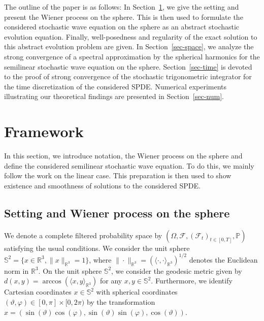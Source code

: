 \documentclass[a4paper]{amsart}
\theoremstyle{remark}
\theoremstyle{definition}
\newcommand{\R}{{\mathbb R}}
\newcommand{\IS}{\mathbb{S}}
\begin{document}
The outline of the paper is as follows: In Section~\ref{sect-fram}, we give the setting and present the Wiener process on the sphere. This is then used to formulate the considered stochastic wave equation on the sphere as an abstract stochastic evolution equation. Finally, well-posedness and regularity of the exact solution to this abstract evolution problem are given. In Section~\ref{sec-space}, we analyze the strong convergence of a spectral approximation by the spherical harmonics for the semilinear stochastic wave equation on the sphere. Section~\ref{sec-time} is devoted to the proof of strong convergence of the stochastic trigonometric integrator for the time discretization of the considered SPDE. Numerical experiments illustrating our theoretical findings are presented in Section~\ref{sec-num}.

\section{Framework}\label{sect-fram}
In this section, we introduce notation, the Wiener process on the sphere and 
define the considered semilinear stochastic wave equation. 
To do this, we mainly follow the work \cite{MR4462619} on the linear case. This preparation is then used to show existence and smoothness of solutions to the considered SPDE. 

\subsection{Setting and Wiener process on the sphere} 
We denote a complete filtered probability space by $(\Omega, \mathcal{F}, (\mathcal{F}_t)_{t\in[0,T]},\mathbb{P})$ satisfying the usual conditions. We consider the unit sphere $\mathbb S^{2}=\{x\in\R^3, \|x\|_{\R^3}=1\}$, where $\|\cdot\|_{\R^3}=(\langle\cdot,\cdot\rangle_{\R^3})^{1/2}$ denotes the Euclidean norm in $\R^3$. On the unit sphere $\IS^2$, we consider the geodesic metric given by $d(x,y)=\arccos(\langle x,y\rangle_{\R^3})$ for any $x,y\in\IS^2$. Furthermore, we identify Cartesian coordinates $x\in\IS^2$ with spherical coordinates $(\vartheta,\varphi)\in[0,\pi]\times[0,2\pi)$ by the transformation 
$x=(\sin(\vartheta)\cos(\varphi),\sin(\vartheta)\sin(\varphi),\cos(\vartheta))$. 
\end{document}

